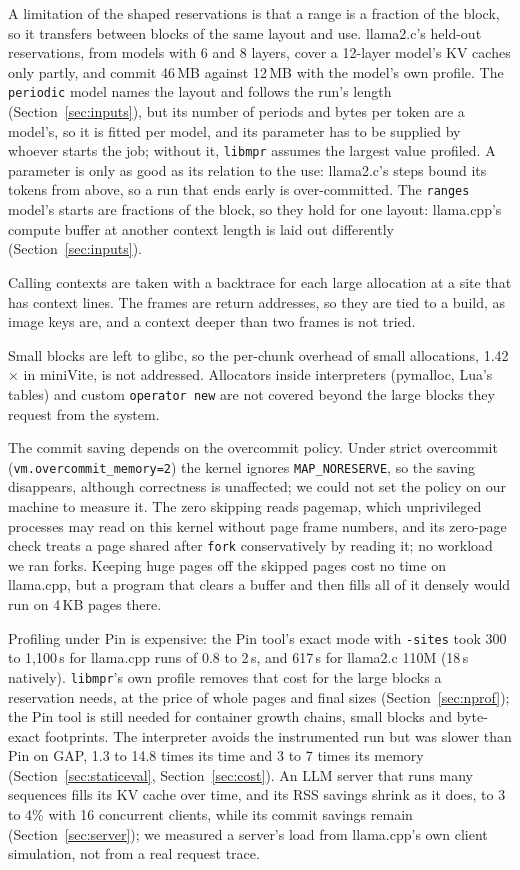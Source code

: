 \documentclass[11pt]{article}
\newcommand{\libmpr}{\texttt{libmpr}}
\newcommand{\secref}[1]{Section~\ref{#1}}
\begin{document}
A limitation of the shaped reservations is that a range is a fraction of the block, so it transfers between
blocks of the same layout and use. llama2.c's held-out reservations, from models with 6 and 8 layers, cover a
12-layer model's KV caches only partly, and commit 46\,MB against 12\,MB with the model's own profile. The
\texttt{periodic} model names the layout and follows the run's length (\secref{sec:inputs}), but its number of
periods and bytes per token are a model's, so it is fitted per model, and its parameter has to be supplied by
whoever starts the job; without it, \libmpr{} assumes the largest value profiled. A parameter is only as good as
its relation to the use: llama2.c's steps bound its tokens from above, so a run that ends early is over-committed.
The \texttt{ranges} model's starts are fractions of the block, so they hold for one layout: llama.cpp's compute
buffer at another context length is laid out differently (\secref{sec:inputs}).

Calling contexts are taken with a backtrace for each large allocation at a site that has context lines. The
frames are return addresses, so they are tied to a build, as image keys are, and a context deeper than two frames
is not tried.

Small blocks are left to glibc, so the per-chunk overhead of small allocations, 1.42$\times$ in miniVite, is not
addressed. Allocators inside interpreters (pymalloc, Lua's tables) and custom \texttt{operator new} are not
covered beyond the large blocks they request from the system.

The commit saving depends on the overcommit policy. Under strict overcommit (\texttt{vm.overcommit\_memory=2}) the
kernel ignores \texttt{MAP\_NORESERVE}, so the saving disappears, although correctness is unaffected; we could not
set the policy on our machine to measure it. The zero skipping reads pagemap, which unprivileged processes may read
on this kernel without page frame numbers, and its zero-page check treats a page shared after \texttt{fork}
conservatively by reading it; no workload we ran forks. Keeping huge pages off the skipped pages cost no time on
llama.cpp, but a program that clears a buffer and then fills all of it densely would run on 4\,KB pages there.

Profiling under Pin is expensive: the Pin tool's exact mode with \texttt{-sites} took 300 to 1{,}100\,s for llama.cpp
runs of 0.8 to 2\,s, and 617\,s for llama2.c 110M (18\,s natively). \libmpr{}'s own profile removes that cost for
the large blocks a reservation needs, at the price of whole pages and final sizes (\secref{sec:nprof}); the Pin tool
is still needed for container growth chains, small blocks and byte-exact footprints. The interpreter avoids the
instrumented run but was slower than Pin on GAP, 1.3 to 14.8 times its time and 3 to 7 times its memory
(\secref{sec:staticeval}, \secref{sec:cost}). An LLM server that runs many sequences fills its KV cache
over time, and its RSS savings shrink as it does, to 3 to 4\% with 16 concurrent clients, while its commit savings
remain (\secref{sec:server}); we measured a server's load from llama.cpp's own client simulation, not from a real
request trace.
\end{document}
